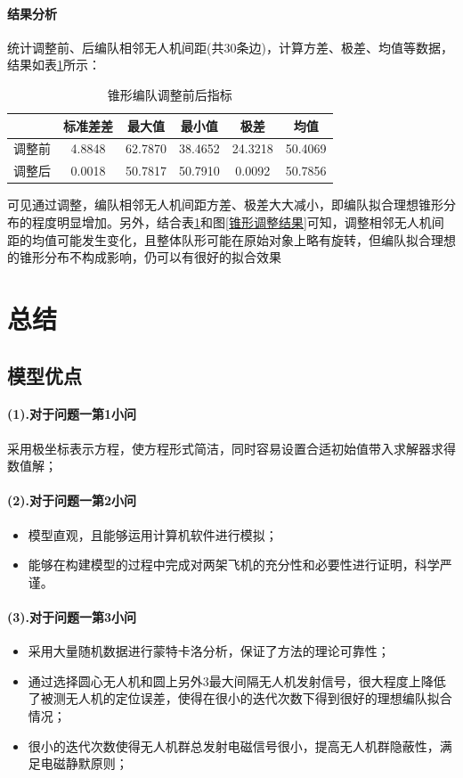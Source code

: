 \documentclass[withoutpreface,bwprint]{cumcmthesis} %
\begin{document}
		\paragraph{结果分析}
		统计调整前、后编队相邻无人机间距(共30条边)，计算方差、极差、均值等数据，结果如表\ref{调整效果}所示：
		\begin{table}[htb]
			\centering
			\begin{tabular}{|c|c|c|c|c|c|}
				\hline
				&标准差差&最大值&最小值&极差&均值\\
				\hline
				调整前&4.8848&62.7870&38.4652&24.3218&50.4069\\
				调整后&0.0018&50.7817&50.7910&0.0092&50.7856\\
				\hline
			\end{tabular}
			\caption{锥形编队调整前后指标}
			\label{调整效果}
		\end{table}
		可见通过调整，编队相邻无人机间距方差、极差大大减小，即编队拟合理想锥形分布的程度明显增加。另外，结合表\ref{调整效果}和图\ref{锥形调整结果}可知，调整相邻无人机间距的均值可能发生变化，且整体队形可能在原始对象上略有旋转，但编队拟合理想的锥形分布不构成影响，仍可以有很好的拟合效果
			
	\section{总结}
	\subsection{模型优点}
	\paragraph{(1).对于问题一第1小问}
	\par 
	采用极坐标表示方程，使方程形式简洁，同时容易设置合适初始值带入求解器求得数值解；\\
	\paragraph{(2).对于问题一第2小问}
	\begin{itemize}
		\item 模型直观，且能够运用计算机软件进行模拟；
		\item 能够在构建模型的过程中完成对两架飞机的充分性和必要性进行证明，科学严谨。
	\end{itemize}
	\paragraph{(3).对于问题一第3小问}
	\begin{itemize}
		\item 采用大量随机数据进行蒙特卡洛分析，保证了方法的理论可靠性；
		\item 通过选择圆心无人机和圆上另外3最大间隔无人机发射信号，很大程度上降低了被测无人机的定位误差，使得在很小的迭代次数下得到很好的理想编队拟合情况；
		\item 很小的迭代次数使得无人机群总发射电磁信号很小，提高无人机群隐蔽性，满足电磁静默原则；
	\end{itemize}
\end{document}
